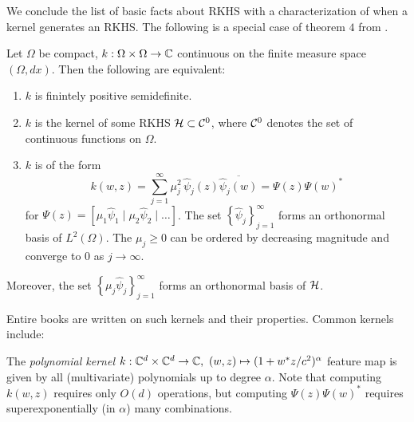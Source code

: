 We conclude the list of basic facts about RKHS with a characterization of 
when a kernel generates an RKHS. The following is a special case of theorem 
$4$ from \cite{RKHS_probability}. 

\begin{theorem}
    \label{thm:RKHS}
    Let $\Omega$ be compact, $k : \Omega \times \Omega \to \mathbb{C}$ continuous on the 
    finite measure space $(\Omega, dx)$. Then the following are equivalent: 
    \begin{enumerate}
        \item $k$ is finintely positive semidefinite. 
        \item $k$ is the kernel of some RKHS $\mathcal{H} \subset \mathcal{C}^0$, where $\mathcal{C}^0$ 
            denotes the set of continuous functions on $\Omega$. 
        \item $k$ is of the form 
            \begin{equation}
                k(w, z) 
                = \sum_{j=1}^{\infty} \mu_j^2\, \hat{\psi}_j (z) \overline{\hat{\psi}_j (w)}
                = \Psi (z) \Psi (w)^*
            \end{equation}
            for $\Psi (z) = \left[ \mu_1 \hat{\psi}_1 \mid \mu_2 \hat{\psi}_2 \mid \ldots \right]$. 
            The set $\left\{ \hat{\psi}_j \right\}_{j=1}^\infty$ forms an orthonormal 
            basis of $L^2 (\Omega)$. 
            The $\mu_j \geq 0$ can be ordered by decreasing magnitude and 
            converge to $0$ as $j \to \infty$. 
    \end{enumerate}
    Moreover, the set $\left\{ \mu_j \hat{\psi}_j \right\}_{j=1}^\infty$
    forms an orthonormal basis of $\mathcal{H}$. 
\end{theorem}

Entire books are written on such kernels \cite{RKHS} and their properties. Common 
kernels include:

\begin{example}
    The \emph{polynomial kernel} 
    $k : \mathbb{C}^d \times \mathbb{C}^d \to \mathbb{C},\ (w, z) \mapsto (1 + w^* z / c^2)^\alpha$ 
    feature map is given by all (multivariate) polynomials up to degree $\alpha$. Note 
    that computing $k(w, z)$ requires only $O(d)$ operations, but computing 
    $\Psi (z) \Psi (w)^*$ requires superexponentially (in $\alpha$) many combinations. 
\end{example}

